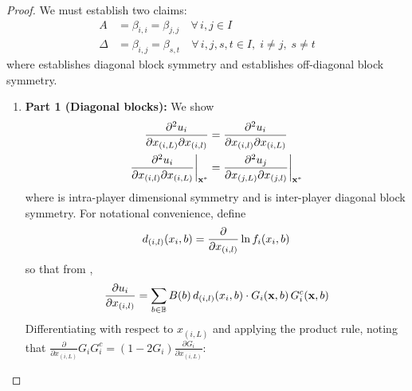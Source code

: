\documentclass{article}
\begin{document}
            \begin{proof}
                We must establish two claims:
                \begin{align}
                    A &= \beta_{i,i} = \beta_{j,j} \quad \forall\, i,j \in I 
                    \label{eq:SI_Jacobian_diag_sym} \\
                    \Delta &= \beta_{i,j} = \beta_{s,t} \quad \forall\, i,j,s,t \in I,\; 
                    i \neq j,\; s \neq t \label{eq:SI_Jacobian_off_sym}
                \end{align}
                where  establishes diagonal block symmetry and  establishes off-diagonal block symmetry.

                \begin{enumerate}
                    \item[] \textbf{Part 1 (Diagonal blocks):} We show
                    \begin{align}
                        \pdv[2]{u_i}{x_{(i,L)}}{x_{(i,l)}} &= 
                        \pdv[2]{u_i}{x_{(i,l)}}{x_{(i,L)}} 
                        \label{eq:SI_Jacobian_intra_dim_sym}\\
                        \pdv[2]{u_i}{x_{(i,l)}}{x_{(i,L)}}\bigg|_{\mathbf{x}^*} &= 
                        \pdv[2]{u_j}{x_{(j,L)}}{x_{(j,l)}}\bigg|_{\mathbf{x}^*}
                        \label{eq:SI_Jacobian_inter_player_diag_sym}
                    \end{align}
                    where  is intra-player dimensional symmetry and  is inter-player diagonal block symmetry.
                    For notational convenience, define
                    \begin{equation}
                        d_{(i,l)}(x_i,b) = \pdv{}{x_{(i,l)}}\ln f_i(x_i,b)
                    \end{equation}
                    so that from ,
                    \begin{equation}
                        \pdv{u_i}{x_{(i,l)}} = \sum_{b \in \mathbb{B}} B(b)\, 
                        d_{(i,l)}(x_i,b) \cdot G_i(\mathbf{x},b)\, G_i^c(\mathbf{x},b)
                    \end{equation}
                    Differentiating with respect to $x_{(i,L)}$ and applying the product rule, noting that $\frac{\partial}{\partial x_{(i,L)}} G_i G_i^c = (1 - 2G_i)\frac{\partial G_i}{\partial x_{(i,L)}}$:

\end{enumerate}
\end{proof}
\end{document}
